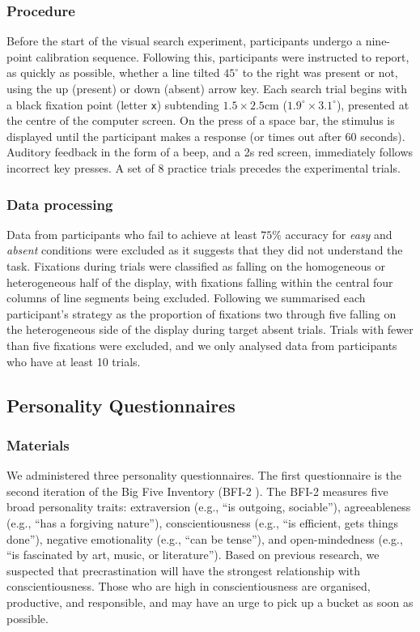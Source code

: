 \documentclass[]{rsos}
\begin{document}
\subsubsection{Procedure} Before the start of the visual search experiment, participants undergo a nine-point calibration sequence. Following this, participants were instructed to report, as quickly as possible, whether a line tilted $45^{\circ}$ to the right was present or not, using the up (present) or down (absent) arrow key. Each search trial begins with a black fixation point (letter \texttt{x}) subtending $1.5\times 2.5$cm ($1.9^{\circ}\times 3.1^{\circ}$), presented at the centre of the computer screen. On the press of a space bar, the stimulus is displayed until the participant makes a response (or times out after 60 seconds). Auditory feedback in the form of a beep, and a 2s red screen, immediately follows incorrect key presses. A set of 8 practice trials precedes the experimental trials.

\subsubsection{Data processing}

Data from participants who fail to achieve at least $75\%$ accuracy for \textit{easy} and \textit{absent} conditions were excluded as it suggests that they did not understand the task. Fixations during trials were classified as falling on the homogeneous or heterogeneous half of the display, with fixations falling within the central four columns of line segments being excluded. Following \cite{nowakowska2017} we summarised each participant's strategy as the proportion of fixations two through five falling on the heterogeneous side of the display during target absent trials. Trials with fewer than five fixations were excluded, and we only analysed data from participants who have at least 10 trials. 

\subsection{Personality Questionnaires}

\subsubsection{Materials}

We administered three personality questionnaires. The first questionnaire is the second iteration of the Big Five Inventory (BFI-2 \cite{soto2017}). The BFI-2 measures five broad personality traits: extraversion (e.g., ``is outgoing, sociable''), agreeableness (e.g., ``has a forgiving nature''), conscientiousness (e.g., ``is efficient, gets things done''), negative emotionality (e.g., ``can be tense''), and open-mindedness (e.g., ``is fascinated by art, music, or literature''). Based on previous research, we suspected that precrastination will have the strongest relationship with conscientiousness. Those who are high in conscientiousness are organised, productive, and responsible, and may have an urge to pick up a bucket as soon as possible.
\end{document}
